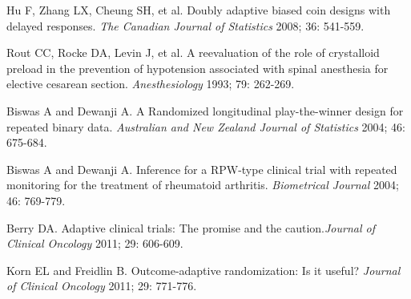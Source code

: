 \begin{thebibliography}
 Hu F,  Zhang LX, Cheung SH, et al. Doubly adaptive biased coin designs with delayed responses.  \textit{The Canadian Journal of Statistics} 2008; 36: 541-559.

 Rout CC, Rocke DA, Levin J, et al.  A reevaluation of the role of crystalloid preload in the prevention of hypotension associated with spinal anesthesia for elective cesarean section. \textit{Anesthesiology} 1993; 79: 262-269.

 Biswas A and Dewanji A. A Randomized longitudinal play-the-winner design for repeated binary data. \textit{Australian and New Zealand Journal of Statistics} 2004; 46: 675-684.

 Biswas A and Dewanji A. Inference for a RPW-type clinical trial with repeated monitoring for the treatment of rheumatoid arthritis. \textit{Biometrical Journal} 2004; 46: 769-779.

 Berry DA. Adaptive clinical trials: The promise and the caution.\textit{Journal of  Clinical Oncology} 2011; 29: 606-609.

 Korn EL and Freidlin B. Outcome-adaptive randomization: Is it useful? \textit{Journal of  Clinical Oncology} 2011; 29: 771-776.

\end{thebibliography}


